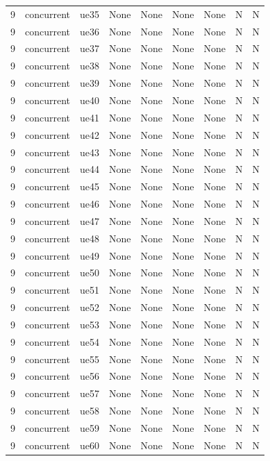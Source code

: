 \begin{table}[ht]
\begin{tabular}{|c|c|c|c|c|c|c|c|c|}
9 & concurrent & ue35 & None & None & None & None & N & N \\
9 & concurrent & ue36 & None & None & None & None & N & N \\
9 & concurrent & ue37 & None & None & None & None & N & N \\
9 & concurrent & ue38 & None & None & None & None & N & N \\
9 & concurrent & ue39 & None & None & None & None & N & N \\
9 & concurrent & ue40 & None & None & None & None & N & N \\
9 & concurrent & ue41 & None & None & None & None & N & N \\
9 & concurrent & ue42 & None & None & None & None & N & N \\
9 & concurrent & ue43 & None & None & None & None & N & N \\
9 & concurrent & ue44 & None & None & None & None & N & N \\
9 & concurrent & ue45 & None & None & None & None & N & N \\
9 & concurrent & ue46 & None & None & None & None & N & N \\
9 & concurrent & ue47 & None & None & None & None & N & N \\
9 & concurrent & ue48 & None & None & None & None & N & N \\
9 & concurrent & ue49 & None & None & None & None & N & N \\
9 & concurrent & ue50 & None & None & None & None & N & N \\
9 & concurrent & ue51 & None & None & None & None & N & N \\
9 & concurrent & ue52 & None & None & None & None & N & N \\
9 & concurrent & ue53 & None & None & None & None & N & N \\
9 & concurrent & ue54 & None & None & None & None & N & N \\
9 & concurrent & ue55 & None & None & None & None & N & N \\
9 & concurrent & ue56 & None & None & None & None & N & N \\
9 & concurrent & ue57 & None & None & None & None & N & N \\
9 & concurrent & ue58 & None & None & None & None & N & N \\
9 & concurrent & ue59 & None & None & None & None & N & N \\
9 & concurrent & ue60 & None & None & None & None & N & N \\

\end{tabular}
\end{table}
